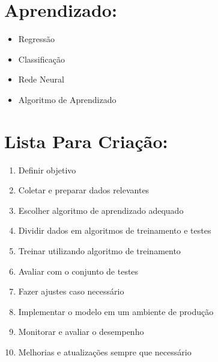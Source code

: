 \documentclass{article}
\begin{document}
\section*{Aprendizado:}
\begin{itemize}
    \item Regressão
    \item Classificação
    \item Rede Neural
    \item Algoritmo de Aprendizado
\end{itemize}

\section*{Lista Para Criação:}
\begin{enumerate}
    \item Definir objetivo
    \item Coletar e preparar dados relevantes
    \item Escolher algoritmo de aprendizado adequado
    \item Dividir dados em algoritmos de treinamento e testes
    \item Treinar utilizando algoritmo de treinamento
    \item Avaliar com o conjunto de testes
    \item Fazer ajustes caso necessário
    \item Implementar o modelo em um ambiente de produção
    \item Monitorar e avaliar o desempenho
    \item Melhorias e atualizações sempre que necessário
\end{enumerate}
\end{document}
